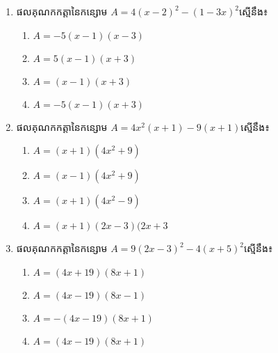 \begin{enumerate}
\item ផលគុណកកត្តានៃកន្សោម $A=4(x-2)^2-(1-3x)^2$ស្មើនឹង៖
\begin{multicols}{2}
\begin{enumerate}[label=\alph*.]
\item $A=-5(x-1)(x-3)$
\item $A=5(x-1)(x+3)$
\item $A=(x-1)(x+3)$
\item $A=-5(x-1)(x+3)$
\end{enumerate}
\end{multicols}

\item ផលគុណកកត្តានៃកន្សោម $A=4x^2(x+1)-9(x+1)$ស្មើនឹង៖
\begin{multicols}{2}
\begin{enumerate}[label=\alph*.]
\item $A=(x+1)(4x^2+9)$
\item $A=(x-1)(4x^2+9)$
\item $A=(x+1)(4x^2-9)$
\item $A=(x+1)(2x-3)(2x+3$
\end{enumerate}
\end{multicols}

\item ផលគុណកកត្តានៃកន្សោម $A=9(2x-3)^2-4(x+5)^2$ស្មើនឹង៖
\begin{multicols}{2}
\begin{enumerate}[label=\alph*.]
\item $A=(4x+19)(8x+1)$
\item $A=(4x-19)(8x-1)$
\item $A=-(4x-19)(8x+1)$
\item $A=(4x-19)(8x+1)$
\end{enumerate}
\end{multicols}




\end{enumerate}

\newpage
\problem

